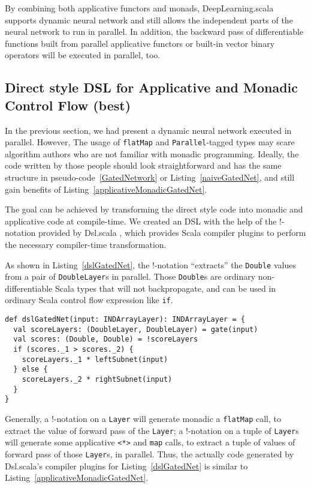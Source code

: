 By combining both applicative functors and monads, DeepLearning.scala supports dynamic neural network and still allows the independent parts of the neural network to run in parallel. In addition, the backward pass of differentiable functions built from parallel applicative functors or built-in vector binary operators will be executed in parallel, too.

\subsection{Direct style DSL for Applicative and Monadic Control Flow (best)}

In the previous section, we had present a dynamic neural network executed in parallel. However, The usage of \lstinline{flatMap} and \lstinline{Parallel}-tagged types may scare algorithm authors who are not familiar with monadic programming. Ideally, the code written by those people should look straightforward and has the same structure in pseudo-code~\ref{GatedNetwork} or Listing~\ref{naiveGatedNet}, and still gain benefits of Listing~\ref{applicativeMonadicGatedNet}.

The goal can be achieved by transforming the direct style code into monadic and applicative code at compile-time. We created an DSL with the help of the !-notation provided by Dsl.scala \cite{yang2017dsl}, which provides Scala compiler plugins to perform the necessary compiler-time transformation.

As shown in Listing~\ref{dslGatedNet}, the !-notation ``extracts'' the \lstinline{Double} values from a pair of \lstinline{DoubleLayer}s in parallel. Those \lstinline{Double}s are ordinary non-differentiable Scala types that will not backpropagate, and can be used in ordinary Scala control flow expression like \lstinline{if}.

\begin{lstlisting}[float={h t b p},caption={Dsl.scala powered direct style gated network}, label={dslGatedNet}]
def dslGatedNet(input: INDArrayLayer): INDArrayLayer = {
  val scoreLayers: (DoubleLayer, DoubleLayer) = gate(input)
  val scores: (Double, Double) = !scoreLayers
  if (scores._1 > scores._2) {
    scoreLayers._1 * leftSubnet(input)
  } else {
    scoreLayers._2 * rightSubnet(input)
  }
}
\end{lstlisting}

Generally, a !-notation on a \lstinline{Layer} will generate monadic a \lstinline{flatMap} call, to extract the value of forward pass of the \lstinline{Layer}; a !-notation on a tuple of \lstinline{Layer}s will generate some applicative \lstinline{<*>} and \lstinline{map} calls, to extract a tuple of values of forward pass of those \lstinline{Layer}s, in parallel. Thus, the actually code generated by Dsl.scala's compiler plugins for Listing~\ref{dslGatedNet} is similar to Listing~\ref{applicativeMonadicGatedNet}.


